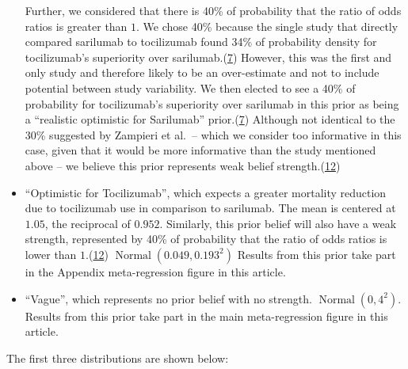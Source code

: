 \documentclass[
  12pt,
]{article}
\begin{document}
\begin{itemize}
  Further, we considered that there is 40\% of probability that the
  ratio of odds ratios is greater than \(1\). We chose 40\% because the
  single study that directly compared sarilumab to tocilizumab found
  34\% of probability density for tocilizumab's superiority over
  sarilumab.(\protect\hyperlink{ref-zotero-3144}{7}) However, this was
  the first and only study and therefore likely to be an over-estimate
  and not to include potential between study variability. We then
  elected to see a 40\% of probability for tocilizumab's superiority
  over sarilumab in this prior as being a ``realistic optimistic for
  Sarilumab'' prior.(\protect\hyperlink{ref-zotero-3144}{7}) Although
  not identical to the 30\% suggested by Zampieri et al.~-- which we
  consider too informative in this case, given that it would be more
  informative than the study mentioned above -- we believe this prior
  represents weak belief
  strength.(\protect\hyperlink{ref-zampieri2021}{12})
\item
  ``Optimistic for Tocilizumab'', which expects a greater mortality
  reduction due to tocilizumab use in comparison to sarilumab. The mean
  is centered at \(1.05\), the reciprocal of \(0.952\). Similarly, this
  prior belief will also have a weak strength, represented by 40\% of
  probability that the ratio of odds ratios is lower than
  \(1\).(\protect\hyperlink{ref-zampieri2021}{12})
  \(\operatorname{Normal}(0.049, 0.193^2)\) Results from this prior take
  part in the Appendix meta-regression figure in this article.
\item
  ``Vague'', which represents no prior belief with no strength.
  \(\operatorname{Normal}(0, 4^2)\). Results from this prior take part
  in the main meta-regression figure in this article.
\end{itemize}

The first three distributions are shown below:
\end{document}
